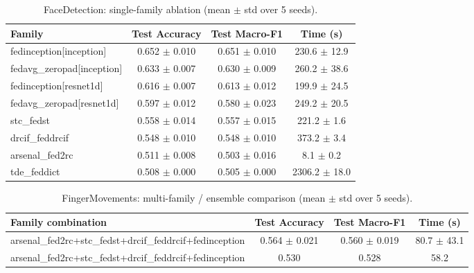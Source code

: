 \begin{table}[t]
\centering
\caption{FaceDetection: single-family ablation (mean $\pm$ std over 5 seeds).}
\label{tab:results_facedetection_ablation}
\begin{tabular}{lccc}
\toprule
Family & Test Accuracy & Test Macro-F1 & Time (s) \\
\midrule
fedinception[inception] & 0.652 $\pm$ 0.010 & 0.651 $\pm$ 0.010 & 230.6 $\pm$ 12.9 \\
fedavg\_zeropad[inception] & 0.633 $\pm$ 0.007 & 0.630 $\pm$ 0.009 & 260.2 $\pm$ 38.6 \\
fedinception[resnet1d] & 0.616 $\pm$ 0.007 & 0.613 $\pm$ 0.012 & 199.9 $\pm$ 24.5 \\
fedavg\_zeropad[resnet1d] & 0.597 $\pm$ 0.012 & 0.580 $\pm$ 0.023 & 249.2 $\pm$ 20.5 \\
stc\_fedst & 0.558 $\pm$ 0.014 & 0.557 $\pm$ 0.015 & 221.2 $\pm$ 1.6 \\
drcif\_feddrcif & 0.548 $\pm$ 0.010 & 0.548 $\pm$ 0.010 & 373.2 $\pm$ 3.4 \\
arsenal\_fed2rc & 0.511 $\pm$ 0.008 & 0.503 $\pm$ 0.016 & 8.1 $\pm$ 0.2 \\
tde\_feddict & 0.508 $\pm$ 0.000 & 0.505 $\pm$ 0.000 & 2306.2 $\pm$ 18.0 \\
\bottomrule
\end{tabular}
\end{table}

\begin{table}[t]
\centering
\caption{FingerMovements: multi-family / ensemble comparison (mean $\pm$ std over 5 seeds).}
\label{tab:results_fingermovements_ensemble}
\begin{tabular}{lccc}
\toprule
Family combination & Test Accuracy & Test Macro-F1 & Time (s) \\
\midrule
arsenal\_fed2rc+stc\_fedst+drcif\_feddrcif+fedinception & 0.564 $\pm$ 0.021 & 0.560 $\pm$ 0.019 & 80.7 $\pm$ 43.1 \\
arsenal\_fed2rc+stc\_fedst+drcif\_feddrcif+fedinception & 0.530 & 0.528 & 58.2 \\
\bottomrule
\end{tabular}
\end{table}

